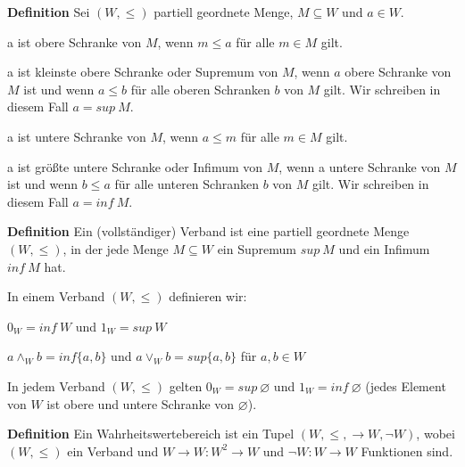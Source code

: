 \documentclass[a4paper]{article}
\renewcommand{\note}[2]{\begin{noteBox} \textbf{#1} #2 \end{noteBox}}
\begin{document}
\begin{multicols}{3}
  \note{Definition}{Sei $(W,\leq)$ partiell geordnete Menge, $M\subseteq W$ und $a\in W$.
    \begin{itemize*}
      \item a ist obere Schranke von $M$, wenn $m\leq a$ für alle $m\in M$ gilt.
      \item a ist kleinste obere Schranke oder Supremum von $M$, wenn $a$ obere Schranke von $M$ ist und wenn $a\leq b$ für alle oberen Schranken $b$ von $M$ gilt. Wir schreiben in diesem Fall $a=sup \ M$.
      \item a ist untere Schranke von $M$, wenn $a\leq m$ für alle $m\in M$ gilt.
      \item a ist größte untere Schranke oder Infimum von $M$, wenn a untere Schranke von $M$ ist und wenn $b\leq a$ für alle unteren Schranken $b$ von $M$ gilt. Wir schreiben in diesem Fall $a=inf\ M$.
    \end{itemize*}
  }

  \note{Definition}{ Ein (vollständiger) Verband ist eine partiell geordnete Menge $(W,\leq)$, in der jede Menge $M\subseteq W$ ein Supremum $sup\ M$ und ein Infimum $inf\ M$ hat.}
  In einem Verband $(W,\leq)$ definieren wir:
  \begin{itemize*}
    \item $0_W = inf\ W$ und $1_W= sup\ W$
    \item $a\wedge_W b= inf\{a,b\}$ und $a\vee_W b= sup\{a,b\}$ für $a,b\in W$
  \end{itemize*}

  In jedem Verband $(W,\leq)$ gelten $0_W= sup\ \varnothing$ und $1_W= inf\ \varnothing$ (jedes Element von $W$ ist obere und untere Schranke von $\varnothing$).

  \note{Definition}{Ein Wahrheitswertebereich ist ein Tupel $(W,\leq,\rightarrow W,\lnot W)$, wobei $(W,\leq)$ ein Verband und $W\rightarrow W:W^2 \rightarrow W$ und $\lnot W:W\rightarrow W$  Funktionen sind.}


\end{multicols}
\end{document}
